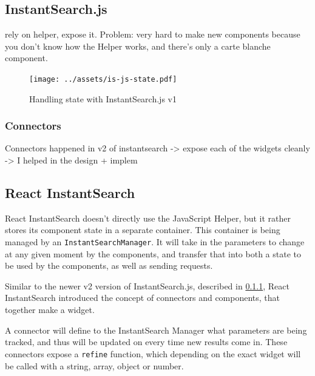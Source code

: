 
\subsection{InstantSearch.js} %
\label{sub:instantsearch_js}

rely on helper, expose it. Problem: very hard to make new components because you don't know how the Helper works, and there's only a carte blanche component. %

\begin{figure}[H]
  \centering
  \texttt{[image: ../assets/is-js-state.pdf]}
  \caption{Handling state with InstantSearch.js v1}
  \label{figure:is-js-state}
\end{figure}

\subsubsection{Connectors} %
\label{ssub:instantsearch_js_connectors}

Connectors happened in v2 of instantsearch
-> expose each of the widgets cleanly
-> I helped in the design + implem %



\subsection{React InstantSearch} %
\label{sub:react_instantearch}

React InstantSearch doesn't directly use the JavaScript Helper, but it rather stores its component state in a separate container. This container is being managed by an {\tt InstantSearchManager}. It will take in the parameters to change at any given moment by the components, and transfer that into both a state to be used by the components, as well as sending requests.

Similar to the newer v2 version of InstantSearch.js, described in \ref{ssub:instantsearch_js_connectors}, React InstantSearch introduced the concept of connectors and components, that together make a widget.

A connector will define to the InstantSearch Manager what parameters are being tracked, and thus will be updated on every time new results come in. These connectors expose a {\tt refine} function, which depending on the exact widget will be called with a string, array, object or number.

